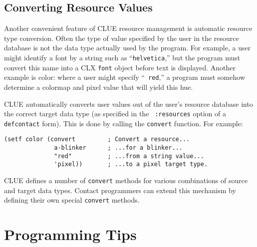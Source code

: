 \begin{center}
 \end{center}

\subsection{Converting Resource Values} 
Another convenient feature of
CLUE resource management is automatic resource type conversion.  Often
the type of value specified by the user in the resource database is not
the data type actually used by the program.  For example, a user might
identify a font by a string such as ``{\tt helvetica},'' but the program
must convert this name into a CLX {\tt font} object before text is
displayed.  Another example is color: where a user might specify ``{\tt
red},'' a program must somehow determine a colormap and pixel value that
will yield this hue.

CLUE automatically converts user values out of the user's resource
database into the correct target data type (as specified in the {\tt
:resources} option of a {\tt defcontact} form). This
is done by calling the {\tt convert} function. For
example:

\begin{verbatim}
(setf color (convert         ; Convert a resource...
              a-blinker      ; ...for a blinker...            
              "red"          ; ...from a string value...              
              'pixel))       ; ...to a pixel target type.
\end{verbatim}

CLUE defines a number of {\tt convert} methods for various combinations
of source and target data types. Contact programmers can extend
this mechanism by defining their own special {\tt convert} methods.

\section{Programming Tips\label{sec:tips}}
